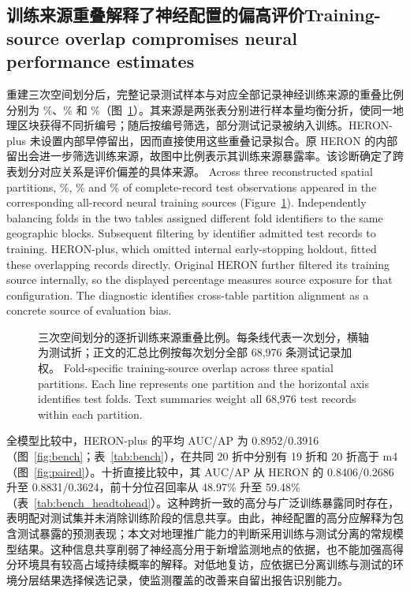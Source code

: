 \subsection{\ifzh 训练来源重叠解释了神经配置的偏高评价\else Training-source overlap compromises neural performance estimates\fi}
\label{sec:neuraldiagnostic}
\ifzh
重建三次空间划分后，完整记录测试样本与对应全部记录神经训练来源的重叠比例分别为 \rwOverlapOne\%、\rwOverlapTwo\% 和 \rwOverlapThree\%（图~\ref{fig:overlap}）。其来源是两张表分别进行样本量均衡分折，使同一地理区块获得不同折编号；随后按编号筛选，部分测试记录被纳入训练。HERON-plus 未设置内部早停留出，因而直接使用这些重叠记录拟合。原 HERON 的内部留出会进一步筛选训练来源，故图中比例表示其训练来源暴露率。该诊断确定了跨表划分对应关系是评价偏差的具体来源。
\else
Across three reconstructed spatial partitions, \rwOverlapOne\%, \rwOverlapTwo\% and \rwOverlapThree\% of complete-record test observations appeared in the corresponding all-record neural training sources (Figure~\ref{fig:overlap}). Independently balancing folds in the two tables assigned different fold identifiers to the same geographic blocks. Subsequent filtering by identifier admitted test records to training. HERON-plus, which omitted internal early-stopping holdout, fitted these overlapping records directly. Original HERON further filtered its training source internally, so the displayed percentage measures source exposure for that configuration. The diagnostic identifies cross-table partition alignment as a concrete source of evaluation bias.
\fi
\begin{figure}[htbp]\centering{}
\caption{\ifzh
三次空间划分的逐折训练来源重叠比例。每条线代表一次划分，横轴为测试折；正文的汇总比例按每次划分全部 68,976 条测试记录加权。
\else
Fold-specific training-source overlap across three spatial partitions. Each line represents one partition and the horizontal axis identifies test folds. Text summaries weight all 68,976 test records within each partition.
\fi}\label{fig:overlap}
\end{figure}
\ifzh
全模型比较中，HERON-plus 的平均 AUC/AP 为 0.8952/0.3916（图~\ref{fig:bench}；表~\ref{tab:bench}），在共同 20 折中分别有 19 折和 20 折高于 m4（图~\ref{fig:paired}）。十折直接比较中，其 AUC/AP 从 HERON 的 0.8406/0.2686 升至 0.8831/0.3624，前十分位召回率从 48.97\% 升至 59.48\%（表~\ref{tab:bench_headtohead}）。这种跨折一致的高分与广泛训练暴露同时存在，表明配对测试集并未消除训练阶段的信息共享。由此，神经配置的高分应解释为包含测试暴露的预测表现；本文对地理推广能力的判断采用训练与测试分离的常规模型结果。这种信息共享削弱了神经高分用于新增监测地点的依据，也不能加强高得分环境具有较高占域持续概率的解释。对低地复访，应依据已分离训练与测试的环境分层结果选择候选记录，使监测覆盖的改善来自留出报告识别能力。
